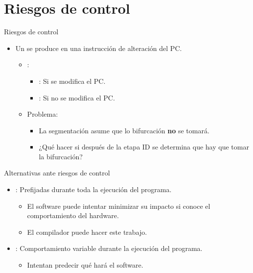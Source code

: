\section{Riesgos de control}

\begin{frame}[t]{Riesgos de control}
\begin{itemize}
  \item Un  se produce en una 
        instrucción de alteración del PC.
    \begin{itemize}
      \item {}:
        \begin{itemize}
          \item {}: Si se modifica el PC.
          \item {}: Si no se modifica el PC.
        \end{itemize}
      \item \alert{Problema}:
        \begin{itemize}
          \item La segmentación asume que lo bifurcación \textbf{no} se tomará.
          \item ¿Qué hacer si después de la etapa ID se determina que hay que tomar la bifurcación?
        \end{itemize}
    \end{itemize}
\end{itemize}
\end{frame}

\begin{frame}[t]{Alternativas ante riesgos de control}
\begin{itemize}
  \item {}: Prefijadas durante toda la ejecución del programa.
    \begin{itemize}
      \item El software puede intentar minimizar su impacto si conoce el comportamiento del hardware.
      \item El compilador puede hacer este trabajo.
    \end{itemize}
  \item {}: Comportamiento variable durante la ejecución del programa.
    \begin{itemize}
      \item Intentan predecir qué hará el software.
    \end{itemize}
\end{itemize}
\end{frame}

